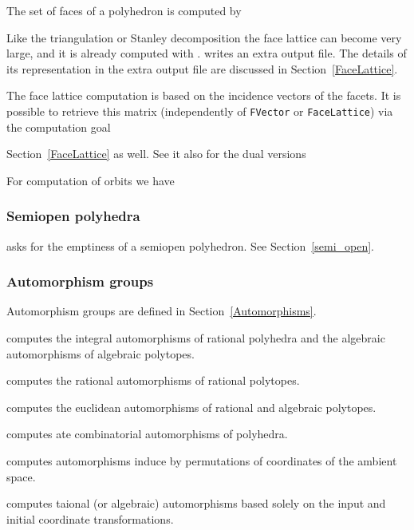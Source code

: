The set of faces of a polyhedron is computed by
\begin{itemize}
	\itemtt[FaceLattice]
\end{itemize}
Like the triangulation or Stanley decomposition the face lattice can become very large, and it is already computed with .  writes an extra output file. The details of its representation in the extra output file are discussed in Section~\ref{FaceLattice}.

The face lattice computation is based on the incidence vectors of the facets. It is possible to retrieve this matrix (independently of \verb|FVector| or \verb|FaceLattice|) via the computation goal
\begin{itemize}
	\itemtt[Incidence]
\end{itemize}
Section~\ref{FaceLattice} as well. See it also for the dual versions
\begin{itemize}
	\itemtt[DualFVector]
	\itemtt[DualFaceLattice]
	\itemtt[DualIncidence]
\end{itemize}

For computation of orbits we have

\begin{itemize}
	\itemtt[FVectorOrbits]
	\itemtt[FaceLatticeOrbits]
	\itemtt[DualFVectorOrbits]
	\itemtt[DualFaceLatticeOrbits]
\end{itemize}

\subsubsection{Semiopen polyhedra}

\begin{itemize}
	\itemtt[IsEmptySemiopen]
\end{itemize}

asks for the emptiness of a semiopen polyhedron. See Section~\ref{semi_open}.


\subsubsection{Automorphism groups}

Automorphism groups are defined in Section~\ref{Automorphisms}.
\begin{itemize}
	\itemtt[Automorphisms] computes the integral automorphisms of rational polyhedra and the algebraic automorphisms of algebraic polytopes.
	
	\itemtt [RationalAutomorphisms] computes the rational automorphisms of rational polytopes.
	
	\itemtt[EuclideanAutomorphisms] computes the euclidean automorphisms of rational and algebraic polytopes.
	
	\itemtt [CombinatorialAutomorphisms] computes ate combinatorial automorphisms of polyhedra.
	
	\itemtt[AmbientAutomorphisms] computes automorphisms induce by permutations of coordinates of the ambient space.
	
	\itemtt[InputAutomorphisms] computes taional (or algebraic) automorphisms based solely on the input and initial coordinate transformations.
\end{itemize}


